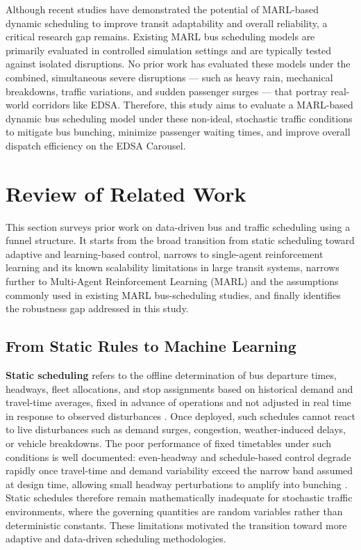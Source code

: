 Although recent studies have demonstrated the potential of MARL-based dynamic scheduling to improve transit adaptability and overall reliability, a critical research gap remains. Existing MARL bus scheduling models are primarily evaluated in controlled simulation settings and are typically tested against isolated disruptions. No prior work has evaluated these models under the combined, simultaneous severe disruptions --- such as heavy rain, mechanical breakdowns, traffic variations, and sudden passenger surges --- that portray real-world corridors like EDSA. Therefore, this study aims to evaluate a MARL-based dynamic bus scheduling model under these non-ideal, stochastic traffic conditions to mitigate bus bunching, minimize passenger waiting times, and improve overall dispatch efficiency on the EDSA Carousel.

\clearpage
\section{Review of Related Work}
This section surveys prior work on data-driven bus and traffic scheduling using a funnel structure. It starts from the broad transition from static scheduling toward adaptive and learning-based control, narrows to single-agent reinforcement learning and its known scalability limitations in large transit systems, narrows further to Multi-Agent Reinforcement Learning (MARL) and the assumptions commonly used in existing MARL bus-scheduling studies, and finally identifies the robustness gap addressed in this study.

\subsection{From Static Rules to Machine Learning}
\textbf{Static scheduling} refers to the offline determination of bus departure times, headways, fleet allocations, and stop assignments based on historical demand and travel-time averages, fixed in advance of operations and not adjusted in real time in response to observed disturbances \cite{Ceder2007}. Once deployed, such schedules cannot react to live disturbances such as demand surges, congestion, weather-induced delays, or vehicle breakdowns. The poor performance of fixed timetables under such conditions is well documented: even-headway and schedule-based control degrade rapidly once travel-time and demand variability exceed the narrow band assumed at design time, allowing small headway perturbations to amplify into bunching \cite{Daganzo2009}. Static schedules therefore remain mathematically inadequate for stochastic traffic environments, where the governing quantities are random variables rather than deterministic constants. These limitations motivated the transition toward more adaptive and data-driven scheduling methodologies.

